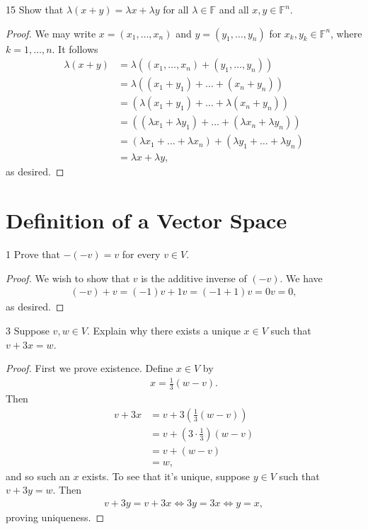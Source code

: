 \documentclass{extarticle}
\newenvironment{problem}[1]{\begin{prob*}{#1}{}}{\end{prob*}}
\newcommand{\F}{\mathbb{F}}
\begin{document}
\begin{problem}{15}
Show that $\lambda(x + y)=\lambda x +\lambda y$ for all $\lambda\in\F$ and all $x,y\in\F^n$.
\end{problem}
\begin{proof}
We may write $x = (x_1, \dots, x_n)$ and $y = (y_1,\dots,y_n)$ for $x_k,y_k\in\F^n$, where $k=1,\dots,n$.  It follows
\begin{align*}
\lambda(x+y) &= \lambda( (x_1,\dots,x_n) + (y_1,\dots,y_n) )\\
&= \lambda ( (x_1 + y_1) + \dots + (x_n + y_n) )\\
&= (\lambda (x_1 + y_1) + \dots + \lambda(x_n + y_n) )\\
&= ((\lambda x_1 + \lambda y_1) + \dots + (\lambda x_n + \lambda y_n))\\
&= (\lambda x_1 + \dots + \lambda x_n) + (\lambda y_1 + \dots + \lambda y_n)\\
&= \lambda x + \lambda y,
\end{align*}
as desired.
\end{proof}


\section{Definition of a Vector Space}

\begin{problem}{1}
Prove that $-(-v)=v$ for every $v\in V$.
\end{problem}
\begin{proof}
We wish to show that $v$ is the additive inverse of $(-v)$.  We have
\begin{align*}
(-v) + v = (-1)v + 1v = (-1 + 1)v = 0v = 0,
\end{align*}
as desired.
\end{proof}

\begin{problem}{3}
Suppose $v,w\in V$.  Explain why there exists a unique $x\in V$ such that $v + 3x = w$.
\end{problem}
\begin{proof}
First we prove existence.  Define $x\in V$ by
\begin{align*}
x = \frac{1}{3}(w - v).
\end{align*}
Then
\begin{align*}
v + 3x &= v + 3\left( \frac{1}{3}(w - v)\right) \\
&= v + \left(3 \cdot \frac{1}{3}\right)(w-v)\\
&= v + (w - v)\\
&= w,
\end{align*}
and so such an $x$ exists.  To see that it's unique, suppose $y\in V$ such that $v + 3y = w$.  Then
\begin{align*}
v + 3y = v + 3x \iff 3y = 3x \iff y = x,
\end{align*}
proving uniqueness.
\end{proof}
\end{document}
